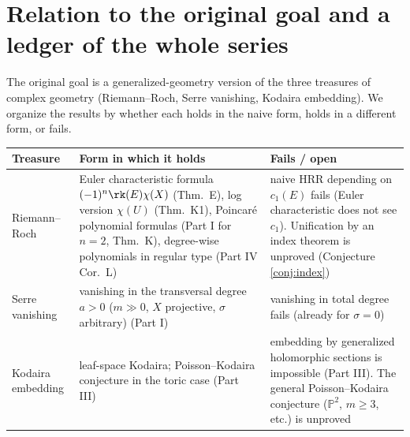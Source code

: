 \section{Relation to the original goal and a ledger of the whole series}\label{sec:ledger}
The original goal is a generalized-geometry version of the three treasures of complex geometry (Riemann--Roch, Serre vanishing, Kodaira embedding). We organize the results by whether each holds in the naive form, holds in a different form, or fails.

\begin{center}\small
\begin{tabular}{>{\raggedright\arraybackslash}p{2.6cm}>{\raggedright\arraybackslash}p{6.2cm}>{\raggedright\arraybackslash}p{6.0cm}}
\toprule Treasure & Form in which it holds & Fails / open\\\midrule
Riemann--Roch & Euler characteristic formula $(-1)^n\rk(E)\chi(X)$ (Thm.\ E), log version $\chi(U)$ (Thm.\ K1), Poincar\'e polynomial formulas (Part I for $n=2$, Thm.\ K), degree-wise polynomials in regular type (Part IV Cor.\ L) & naive HRR depending on $c_1(E)$ fails (Euler characteristic does not see $c_1$). Unification by an index theorem is unproved (Conjecture \ref{conj:index})\\\midrule
Serre vanishing & vanishing in the transversal degree $a>0$ ($m\gg0$, $X$ projective, $\sigma$ arbitrary) (Part I) & vanishing in total degree fails (already for $\sigma=0$)\\\midrule
Kodaira embedding & leaf-space Kodaira; Poisson--Kodaira conjecture in the toric case (Part III) & embedding by generalized holomorphic sections is impossible (Part III). The general Poisson--Kodaira conjecture ($\mathbb P^2$, $m\ge3$, etc.) is unproved\\\bottomrule
\end{tabular}
\end{center}

